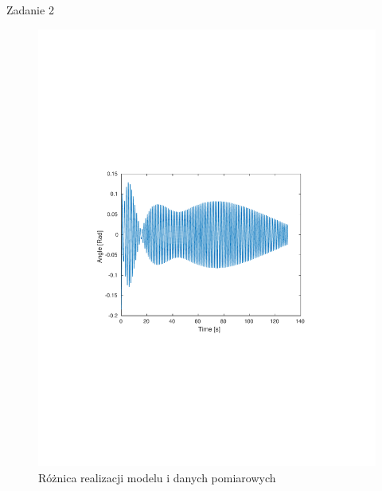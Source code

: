 \documentclass[12pt]{article}
\begin{document}
\begin{section}{Zadanie 2}
    \begin{figure}[!htb]
      \begin{center}
        \includegraphics[width=14cm,trim=3cm 8.5cm 3cm 9cm,clip]
        {../res/img/err12.pdf}
      \end{center}
      \caption{Różnica realizacji modelu i danych pomiarowych}
      \label{plot:err12}
    \end{figure}
    
    \newpage

  \end{section}
\end{document}
